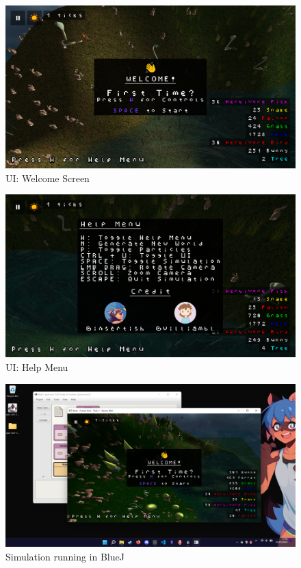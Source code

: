 \documentclass{article}
\begin{document}
    \begin{figure}
        \centering
        \includegraphics[width=\textwidth]{../screenshots/ui-welcome.png}
        \caption{UI: Welcome Screen} \label{fig:screenshot-ui-welcome}
    \end{figure}
    \begin{figure}
        \centering
        \includegraphics[width=\textwidth]{../screenshots/ui-help.png}
        \caption{UI: Help Menu} \label{fig:screenshot-ui-help}
    \end{figure}
    \begin{figure}
        \centering
        \includegraphics[width=\textwidth]{images/bluej.png}
        \caption{Simulation running in BlueJ \cite{BlueJ}} \label{fig:bluej}
    \end{figure}
\end{document}
